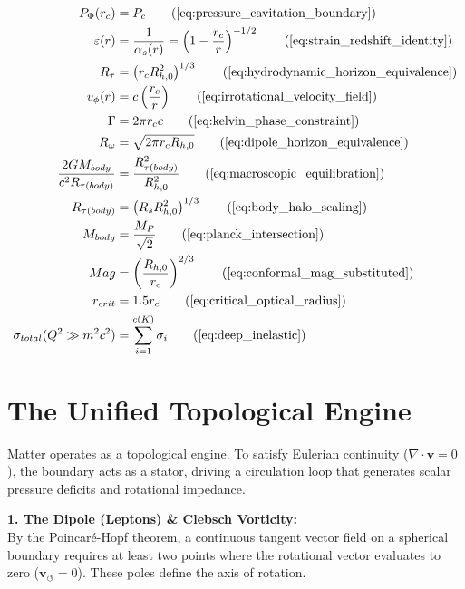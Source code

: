 \begin{tcolorbox}[recallbox, title={\ref{box:localized_metric_strain}. The Localized Metric}]
\begin{align}
    P_\Phi(r_c) &= P_c \tag{\ref{eq:pressure_cavitation_boundary}} \\
    \varepsilon(r) &= \frac{1}{\alpha_s(r)} = \left( 1 - \frac{r_c}{r} \right)^{-1/2} \tag{\ref{eq:strain_redshift_identity}} \\
    R_\tau &= \left( r_c R_{h,0}^2 \right)^{1/3} \tag{\ref{eq:hydrodynamic_horizon_equivalence}} \\
    v_\phi(r) &= c \left( \frac{r_c}{r} \right) \tag{\ref{eq:irrotational_velocity_field}} \\
    \Gamma &= 2\pi r_c c \tag{\ref{eq:kelvin_phase_constraint}} \\
    R_\omega &= \sqrt{2\pi r_c R_{h,0}} \tag{\ref{eq:dipole_horizon_equivalence}} \\
    \frac{2 G M_{body}}{c^2 R_{\tau(body)}} &= \frac{R_{\tau(body)}^2}{R_{h,0}^2} \tag{\ref{eq:macroscopic_equilibration}} \\
    R_{\tau(body)} &= \left( R_s R_{h,0}^2 \right)^{1/3} \tag{\ref{eq:body_halo_scaling}} \\
    M_{body} &= \frac{M_P}{\sqrt{2}} \tag{\ref{eq:planck_intersection}} \\
    Mag &= \left( \frac{R_{h,0}}{r_c} \right)^{2/3} \tag{\ref{eq:conformal_mag_substituted}} \\
    r_{crit} &= 1.5 r_c \tag{\ref{eq:critical_optical_radius}} \\
    \sigma_{total}(Q^2 \gg m^2 c^2) &= \sum_{i=1}^{c(K)} \sigma_i \tag{\ref{eq:deep_inelastic}} 
\end{align}
\end{tcolorbox}






\section{The Unified Topological Engine}
\label{sec:deriv_unified_engine}

Matter operates as a topological engine. To satisfy Eulerian continuity ($\nabla \cdot \mathbf{v} = 0$), the boundary acts as a stator, driving a circulation loop that generates scalar pressure deficits and rotational impedance. 

\textbf{1. The Dipole (Leptons) \& Clebsch Vorticity:} \\
By the Poincaré-Hopf theorem, a continuous tangent vector field on a spherical boundary requires at least two points where the rotational vector evaluates to zero ($\mathbf{v}_{\circlearrowleft} = 0$). These poles define the axis of rotation. 

